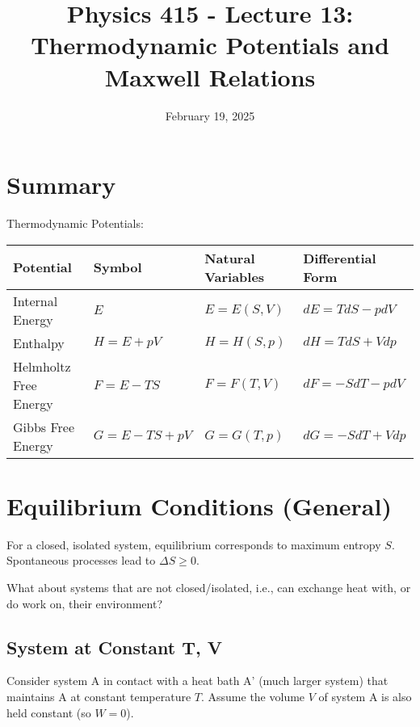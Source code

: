 \documentclass[11pt]{article}
\title{Physics 415 - Lecture 13: Thermodynamic Potentials and Maxwell Relations}
\date{February 19, 2025}
\author{} %
\begin{document}
\maketitle
\thispagestyle{empty}

\section*{Summary}

Thermodynamic Potentials:
\begin{center}
\begin{tabular}{llll}
\toprule
Potential & Symbol & Natural Variables & Differential Form \\
\midrule
Internal Energy & $E$ & $E=E(S,V)$ & $dE = TdS - pdV$ \\
Enthalpy & $H=E+pV$ & $H=H(S,p)$ & $dH = TdS + Vdp$ \\
Helmholtz Free Energy & $F=E-TS$ & $F=F(T,V)$ & $dF = -SdT - pdV$ \\
Gibbs Free Energy & $G=E-TS+pV$ & $G=G(T,p)$ & $dG = -SdT + Vdp$ \\
\bottomrule
\end{tabular}
\end{center}

\section*{Equilibrium Conditions (General)}

For a closed, isolated system, equilibrium corresponds to maximum entropy $S$. Spontaneous processes lead to $\Delta S \ge 0$.

What about systems that are not closed/isolated, i.e., can exchange heat with, or do work on, their environment?

\subsection*{System at Constant T, V}

Consider system A in contact with a heat bath A' (much larger system) that maintains A at constant temperature $T$. Assume the volume $V$ of system A is also held constant (so $W=0$).

\begin{center}
\end{center}
\end{document}
